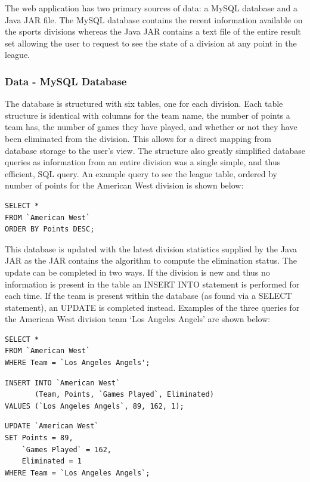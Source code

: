 The web application has two primary sources of data: a MySQL database and a
Java JAR file. The MySQL database contains the recent information available
on the sports divisions whereas the Java JAR contains a text file of the entire
result set allowing the user to request to see the state of a division at any
point in the league.

\subsubsection{Data - MySQL Database}

The database is structured with six tables, one for each division. Each table
structure is identical with columns for the team name, the number of points
a team has, the number of games they have played, and whether or not they have
been eliminated from the division. This allows for a direct mapping from
database storage to the user's view. The structure also greatly simplified
database queries as information from an entire division was a single simple, and
thus efficient, SQL query. An example query to see the league table, ordered by
number of points for the American West division is shown below:

\begin{verbatim}
SELECT *
FROM `American West`
ORDER BY Points DESC;
\end{verbatim}

This database is updated with the latest division statistics supplied by the
Java JAR as the JAR contains the algorithm to compute the elimination status.
The update can be completed in two ways. If the division is new and thus no
information is present in the table an INSERT INTO statement is performed for
each time. If the team is present within the database (as found via a SELECT
statement), an UPDATE is completed instead. Examples of the three queries
for the American West division team `Los Angeles Angels' are shown below:

\begin{verbatim}
SELECT *
FROM `American West`
WHERE Team = `Los Angeles Angels';
\end{verbatim}

\begin{verbatim}
INSERT INTO `American West`
       (Team, Points, `Games Played`, Eliminated)
VALUES (`Los Angeles Angels`, 89, 162, 1);
\end{verbatim}

\begin{verbatim}
UPDATE `American West`
SET Points = 89,
    `Games Played` = 162,
    Eliminated = 1
WHERE Team = `Los Angeles Angels`;
\end{verbatim}

